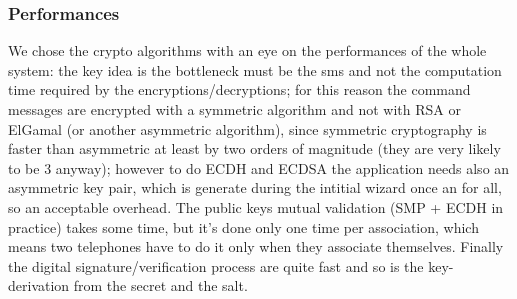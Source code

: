 \subsubsection{Performances}
We chose the crypto algorithms with an eye on the performances of the whole system: the key idea is the bottleneck must be the sms and not the computation time required by the encryptions/decryptions; for this reason the command messages are encrypted with a symmetric algorithm and not with RSA or ElGamal (or another asymmetric algorithm), since symmetric cryptography is faster than asymmetric at least by two orders of magnitude (they are very likely to be 3 anyway); however to do ECDH and ECDSA the application needs also an asymmetric key pair, which is generate during the intitial wizard once an for all, so an acceptable overhead. The public keys mutual validation (SMP + ECDH in practice) takes some time, but it's done only one time per association, which means two telephones have to do it only when they associate themselves. Finally the digital signature/verification process are quite fast and so is the key-derivation from the secret and the salt.